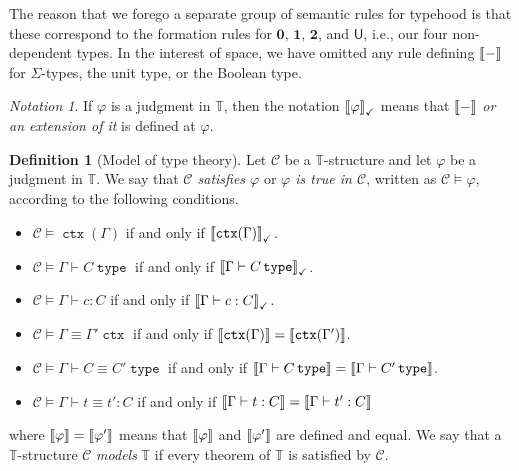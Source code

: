 \documentclass[10pt,letterpaper,cm]{nupset}
\theoremstyle{definition}
\newtheorem{definition}{Definition}[subsection]
\theoremstyle{theorem}
\theoremstyle{remark}
\newtheorem*{notation}{Notation}
\newcommand{\U}{\mathsf{U}}
\newcommand{\0}{\mathbf{0}}
\newcommand{\1}{\mathbf{1}}
\newcommand{\2}{\mathbf{2}}
\DeclareMathOperator{\ctx}{\mathtt{ctx}}
\DeclareMathOperator{\type}{\mathtt{type}}
\renewcommand{\c}{\mathscr{C}}
\newcommand{\T}{\mathbb T}
\newcommand{\bi}{\begin{itemize}}
\newcommand{\ei}{\end{itemize}}
\begin{document}
\medskip

The reason that we forego a separate group of semantic rules for typehood is that these correspond to the formation rules for $\0$, $\1$, $\2$, and $\U$, i.e., our four non-dependent types. In the interest of space, we have omitted any rule defining $\mleft\llbracket{-}\mright\rrbracket$ for $\Sigma$-types, the unit type, or the Boolean type.

\medskip

\begin{notation}
If $\varphi$ is a judgment in $\T$, then the notation $\mleft\llbracket{\varphi}\mright\rrbracket_{\checkmark}$ means that $\mleft\llbracket{-}\mright\rrbracket$ \emph{or an extension of it} is defined at $\varphi$.
\end{notation}

\begin{definition}[Model of type theory]\label{satis1}
Let $\c$ be a $\T$-structure and let $\varphi$ be a judgment in $\T$. We say that \textit{$\c$ satisfies $\varphi$} or \textit{$\varphi$ is true in $\c$}, written as $\c \models \varphi$, according to the following conditions.
\bi
\item $\c \models {\ctx(\Gamma)}$ if and only if  $\mleft\llbracket{\ctx(\Gamma)}\mright\rrbracket_{\checkmark}$.
\item $\c \models {\Gamma \vdash C \type}$ if and only if $\mleft\llbracket{\Gamma \vdash C \type}\mright\rrbracket_{\checkmark}$.
\item $\c \models {\Gamma \vdash c:C}$ if and only if $\mleft\llbracket{\Gamma \vdash c:C}\mright\rrbracket_{\checkmark}$.
\item  $\c \models { \Gamma \equiv \Gamma'  \ctx}$ if and only if $\mleft\llbracket{\ctx(\Gamma)}\mright\rrbracket = \mleft\llbracket{\ctx(\Gamma')}\mright\rrbracket$.
\item $\c \models {\Gamma \vdash  C \equiv C' \type}$ if and only if $\mleft\llbracket{\Gamma \vdash C \type}\mright\rrbracket = \mleft\llbracket{\Gamma \vdash C' \type}\mright\rrbracket$.
\item $\c \models { \Gamma \vdash t \equiv t' : C}$ if and only if $\mleft\llbracket{\Gamma \vdash t : C}\mright\rrbracket = \mleft\llbracket{\Gamma \vdash t' : C}\mright\rrbracket$
\ei
where $\mleft\llbracket{\varphi}\mright\rrbracket=\mleft\llbracket{\varphi'}\mright\rrbracket $ means that $\mleft\llbracket{\varphi}\mright\rrbracket$ and $\mleft\llbracket{\varphi'}\mright\rrbracket$ are defined and equal.  
We say that a $\T$-structure $\c$ \textit{models} $\T$ if every theorem of $\T$ is satisfied by $\c$.
\end{definition}
\end{document}
